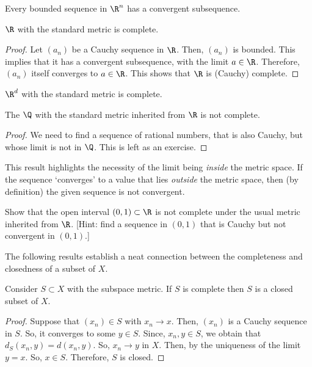 \begin{nthm}
  Every bounded sequence in $\R^n$ has a convergent subsequence.
\end{nthm}

\begin{nprop}
  $\R$ with the standard metric is complete.
\end{nprop}
\begin{proof}
  Let $(a_n)$ be a Cauchy sequence in $\R$. Then, $(a_n)$ is bounded. This implies that it has a convergent subsequence, with the limit $a \in \R$. Therefore, $(a_n)$ itself converges to $a \in \R$. This shows that $\R$ is (Cauchy) complete.
\end{proof}

\begin{nprop}
  $\R^d$ with the standard metric is complete.
\end{nprop}

\begin{nprop}
  The $\Q$ with the standard metric inherited from $\R$ is not complete.
\end{nprop}
\begin{proof}
  We need to find a sequence of rational numbers, that is also Cauchy, but whose limit is not in $\Q$. This is left as an exercise.
\end{proof}
This result highlights the necessity of the limit being \emph{inside} the metric space. If the sequence `converges' to a value that lies \emph{outside} the metric space, then (by definition) the given sequence is not convergent.

\begin{nex}
  Show that the open interval $(0,1) \subset \R$ is not complete under the usual metric inherited from $\R$. [Hint: find a sequence in $(0,1)$ that is Cauchy but not convergent in $(0,1)$.]
\end{nex}

The following results establish a neat connection between the completeness and closedness of a subset of $X$.
\begin{nprop}
  Consider $S \subset X$ with the subspace metric. If $S$ is complete then $S$ is a closed subset of $X$.
\end{nprop}
\begin{proof}
  Suppose that $(x_n) \in S$ with $x_n \to x$. Then, $(x_n)$ is a Cauchy sequence in $S$. So, it converges to some $y \in S$. Since, $x_n, y \in S$, we obtain that $d_{S}(x_n, y) = d(x_n, y)$. So, $x_n \to y$ in $X$. Then, by the uniqueness of the limit $y=x$. So, $x \in S$. Therefore, $S$ is closed.
\end{proof}


